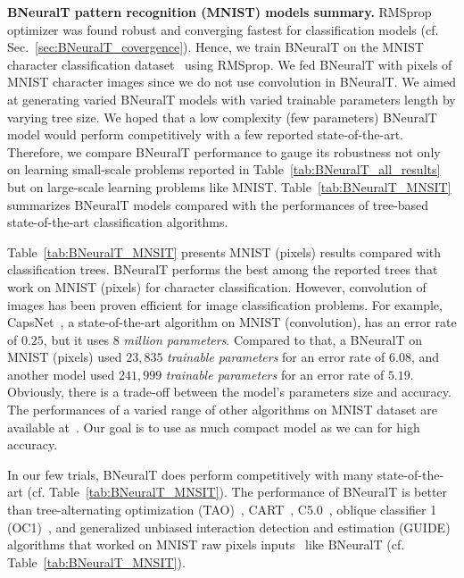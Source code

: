 \documentclass[11pt,a4paper]{article}
\begin{document}
    \textbf{BNeuralT pattern recognition (MNIST) models summary.}   RMSprop optimizer was found robust and converging fastest for classification models 
(cf. Sec.~\ref{sec:BNeuralT_covergence}).
Hence, we train BNeuralT on the MNIST character classification dataset~\citep{mnistDataSet} using RMSprop. We fed BNeuralT with pixels of MNIST character images since we do not use convolution in BNeuralT. 
We aimed at generating varied BNeuralT models with varied trainable parameters length by varying tree size. We hoped that a low complexity (few parameters) BNeuralT model would perform competitively with a few reported state-of-the-art. Therefore, we compare BNeuralT performance to gauge its robustness not only on learning small-scale problems reported in Table~\ref{tab:BNeuralT_all_results} but on large-scale learning problems like MNIST. Table~\ref{tab:BNeuralT_MNSIT} summarizes BNeuralT models compared with the performances of tree-based state-of-the-art classification algorithms. 
    	
    Table~\ref{tab:BNeuralT_MNSIT} presents MNIST (pixels) results compared with classification trees. BNeuralT performs the best among the reported trees that work on MNIST (pixels) for character classification. However, convolution of images has been proven efficient for image classification problems. For example, CapsNet~\citep{sabour2017dynamic}, a state-of-the-art algorithm on MNIST (convolution), has an error rate of $0.25$, but it uses $8$ \textit{million parameters}. Compared to that, a BNeuralT on MNIST (pixels) used $23,835$ \textit{trainable parameters} for an error rate of $6.08$, and another model used $241,999$ \textit{trainable parameters} for an error rate of $5.19$. Obviously, there is a trade-off between the model's parameters size and accuracy. The performances of a varied range of other algorithms on MNIST dataset are available at~\citep{mnistDataSet}. Our goal is to use as much compact model as we can for high accuracy. 
    	
    In our few trials, BNeuralT does perform competitively with many state-of-the-art (cf. Table~\ref{tab:BNeuralT_MNSIT}). The performance of BNeuralT is better than
tree-alternating optimization (TAO)~\citep{carreira2018alternating}, 
CART~\citep{breiman1984classification},
C5.0~\citep{quinlan2014c4}, 
oblique classifier 1 (OC1)~\citep{murthy1993oc1}, and 
generalized unbiased interaction detection and estimation (GUIDE)~\citep{loh2014fifty} 
algorithms that worked on MNIST raw pixels inputs~\citep{zharmagambetov2019experimental} like BNeuralT (cf. Table~\ref{tab:BNeuralT_MNSIT}). 
    	
\end{document}
